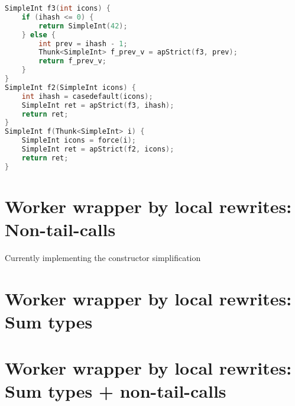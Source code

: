 \documentclass[sigplan,\review anonymous]{acmart}
\begin{document}
{\footnotesize
\begin{lstlisting}[language=c++, caption=replace call \texttt{f2(SimpleInt(prev))} to \texttt{f3(prev)}]
SimpleInt f3(int icons) {
    if (ihash <= 0) {
        return SimpleInt(42);
    } else {
        int prev = ihash - 1;
        Thunk<SimpleInt> f_prev_v = apStrict(f3, prev);
        return f_prev_v;
    }
}
SimpleInt f2(SimpleInt icons) {
    int ihash = casedefault(icons);
    SimpleInt ret = apStrict(f3, ihash);
    return ret;
}
SimpleInt f(Thunk<SimpleInt> i) {
    SimpleInt icons = force(i);
    SimpleInt ret = apStrict(f2, icons);
    return ret;
}
\end{lstlisting}
}



\section{Worker wrapper by local rewrites: Non-tail-calls}

Currently implementing the constructor simplification

\section{Worker wrapper by local rewrites: Sum types}


\section{Worker wrapper by local rewrites: Sum types + non-tail-calls}
\end{document}
